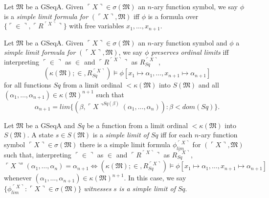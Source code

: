 \documentclass[12pt]{article}
\numberwithin{equation}{section}
\begin{document}
\begin{defi}
Let $\mathfrak{M}$ be a GSeqA. Given $\ulcorner X \urcorner \in \sigma(\mathfrak{M})$ an $n$-ary function symbol, we say $\phi$ is a \emph{simple limit formula for} $(\ulcorner X \urcorner, \mathfrak{M})$ iff $\phi$ is a formula over $\{\ulcorner \in \urcorner, \ulcorner R^{\ulcorner X \urcorner} \urcorner\}$ with free variables $x_1, \dots, x_{n+1}$.
\end{defi}

\begin{defi}\label{def234c}
Let $\mathfrak{M}$ be a GSeqA. Given $\ulcorner X \urcorner \in \sigma(\mathfrak{M})$ an $n$-ary function symbol and $\phi$ a \emph{simple limit formula for} $(\ulcorner X \urcorner, \mathfrak{M})$, we say $\phi$ \emph{preserves ordinal limits} iff interpreting $\ulcorner \in \urcorner$ as $\in$ and $\ulcorner R^{\ulcorner X \urcorner} \urcorner$ as $R_{Sq}^{\ulcorner X \urcorner}$, 
\begin{equation*}
    (\kappa(\mathfrak{M}); \in, R_{Sq}^{\ulcorner X \urcorner}) \models \phi[x_1 \mapsto \alpha_1, \dots, x_{n+1} \mapsto \alpha_{n+1}]
\end{equation*}
for all functions $Sq$ from a limit ordinal $< \kappa(\mathfrak{M})$ into $S(\mathfrak{M})$ and all $(\alpha_1, \dots, \alpha_{n+1}) \in \kappa(\mathfrak{M})^{n+1}$ such that 
\begin{equation*}
    \alpha_{n+1} = lim \{(\beta, \ulcorner X \urcorner^{Sq(\beta)}(\alpha_1, \dots, \alpha_n)) : \beta < dom(Sq)\} \text{.}
\end{equation*}
\end{defi}

\begin{defi}\label{def234}
Let $\mathfrak{M}$ be a GSeqA and $Sq$ be a function from a limit ordinal $< \kappa(\mathfrak{M})$ into $S(\mathfrak{M})$. A state $s \in S(\mathfrak{M})$ is a \emph{simple limit of} $Sq$ iff for each $n$-ary function symbol $\ulcorner X \urcorner \in \sigma(\mathfrak{M})$ there is a simple limit formula $\phi_{lim}^{\ulcorner X \urcorner}$ for $(\ulcorner X \urcorner, \mathfrak{M})$ such that, interpreting $\ulcorner \in \urcorner$ as $\in$ and $\ulcorner R^{\ulcorner X \urcorner} \urcorner$ as $R_{Sq}^{\ulcorner X \urcorner}$, 
\begin{equation*}
    \ulcorner X \urcorner^s (\alpha_1, \dots, \alpha_n) = \alpha_{n+1} \iff (\kappa(\mathfrak{M}); \in, R_{Sq}^{\ulcorner X \urcorner}) \models \phi[x_1 \mapsto \alpha_1, \dots, x_{n+1} \mapsto \alpha_{n+1}]
\end{equation*}
whenever $(\alpha_1, \dots, \alpha_{n+1}) \in \kappa(\mathfrak{M})^{n+1}$. In this case, we say $\{\phi_{lim}^{\ulcorner X \urcorner} : \ulcorner X \urcorner \in \sigma(\mathfrak{M})\}$ \emph{witnesses} $s$ \emph{is a simple limit of} $Sq$.
\end{defi}
\end{document}
